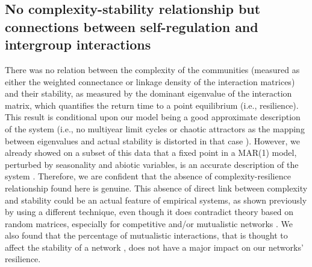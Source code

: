\documentclass[10pt]{article}
\begin{document}
\subsection*{No complexity-stability relationship but connections between self-regulation and intergroup interactions}

There was no relation between the complexity of the communities (measured
as either the weighted connectance or linkage density of the interaction
matrices) and their stability, as measured by the dominant eigenvalue
of the interaction matrix, which quantifies the return time to a point
equilibrium (i.e., resilience). This result is conditional upon our
model being a good approximate description of the system (i.e., no
multiyear limit cycles or chaotic attractors as the mapping between
eigenvalues and actual stability is distorted in that case \citealp{certain_how_2018}).
However, we already showed on a subset of this data that a fixed point
in a MAR(1) model, perturbed by seasonality and abiotic variables,
is an accurate description of the system \citep{barraquand_coastal_2018}.
Therefore, we are confident that the absence of complexity-resilience relationship
found here is genuine. This absence of direct link between complexity
and stability could be an actual feature of empirical systems, as
shown previously by \citet{jacquet_no_2016} using a different technique,
even though it does contradict theory
based on random matrices, especially for competitive and/or mutualistic
networks \citep{allesina_stability_2012}. We also found that the
percentage of mutualistic interactions, that is thought to affect
the stability of a network \citep{mougi2012diversity,coyte_ecology_2015,garcia-callejas_multiple_2018},
does not have a major impact on our networks' resilience.
\end{document}
